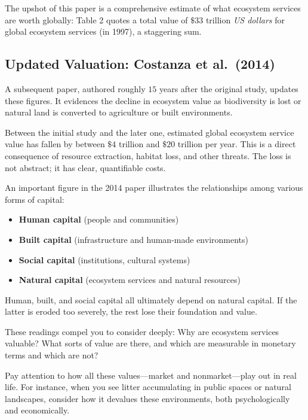 \documentclass[
  11pt,
]{book}
\providecommand{\tightlist}{%
  \setlength{\itemsep}{0pt}\setlength{\parskip}{0pt}}
\begin{document}
The upshot of this paper is a comprehensive estimate of what ecosystem
services are worth globally: Table 2 quotes a total value of \(\$33\)
trillion \emph{US dollars} for global ecosystem services (in 1997), a
staggering sum.

\subsection{Updated Valuation: Costanza et
al.~(2014)}\label{updated-valuation-costanza-et-al.-2014}

A subsequent paper, authored roughly \(15\) years after the original
study, updates these figures. It evidences the decline in ecosystem
value as biodiversity is lost or natural land is converted to
agriculture or built environments.

Between the initial study and the later one, estimated global ecosystem
service value has fallen by between \(\$4\) trillion and \(\$20\)
trillion per year. This is a direct consequence of resource extraction,
habitat loss, and other threats. The loss is not abstract; it has clear,
quantifiable costs.

An important figure in the 2014 paper illustrates the relationships
among various forms of capital:

\begin{itemize}
\tightlist
\item
  \textbf{Human capital} (people and communities)
\item
  \textbf{Built capital} (infrastructure and human-made environments)
\item
  \textbf{Social capital} (institutions, cultural systems)
\item
  \textbf{Natural capital} (ecosystem services and natural resources)
\end{itemize}

Human, built, and social capital all ultimately depend on natural
capital. If the latter is eroded too severely, the rest lose their
foundation and value.

These readings compel you to consider deeply: Why are ecosystem services
valuable? What sorts of value are there, and which are measurable in
monetary terms and which are not?

Pay attention to how all these values---market and nonmarket---play out
in real life. For instance, when you see litter accumulating in public
spaces or natural landscapes, consider how it devalues these
environments, both psychologically and economically.
\end{document}
